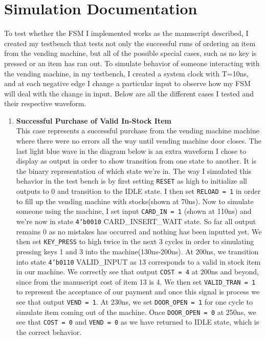 \documentclass{article}
\begin{document}
\section{Simulation Documentation}
To test whether the FSM I implemented works as the manuscript described, I created my testbench that tests not only the successful runs of ordering an item from the vending machine, but all of the possible special cases, such as no key is pressed or an item has ran out. To simulate behavior of someone interacting with the vending machine, in my testbench, I created a system clock with T=10ns, and at each negative edge I change a particular input to observe how my FSM will deal with the change in input. Below are all the different cases I tested and their respective waveform.
\begin{enumerate}
    \item \textbf{Successful Purchase of Valid In-Stock Item} \\
    This case represents a successful purchase from the vending machine machine where there were no errors all the way until vending machine door closes. The last light blue wave in the diagram below is an extra waveform I chose to display as output in order to show transition from one state to another. It is the binary representation of which state we're in. The way I simulated this behavior in the test bench is by first setting \texttt{RESET} as high to initialize all outputs to 0 and transition to the IDLE state. I then set \texttt{RELOAD = 1} in order to fill up the vending machine with stocks(shown at 70ns). Now to simulate someone using the machine, I set input \texttt{CARD\_IN = 1} (shown at 110ns) and we're now in state \texttt{4'b0010} CARD\_INSERT\_WAIT state. So far all output remains 0 as no mistakes has occurred and nothing has been inputted yet. We then set \texttt{KEY\_PRESS} to high twice in the next 3 cycles in order to simulating pressing keys 1 and 3 into the machine(130ns-200ns). At 200ns, we transition into state \texttt{4'b0110} VALID\_INPUT as 13 corresponds to a valid in stock item in our machine. We correctly see that output \texttt{COST = 4} at 200ns and beyond, since from the manuscript cost of item 13 is 4. We then set \texttt{VALID\_TRAN = 1} to represent the acceptance of our payment and once this signal is process we see that output \texttt{VEND = 1}. At 230ns, we set \texttt{DOOR\_OPEN = 1} for one cycle to simulate item coming out of the machine. Once \texttt{DOOR\_OPEN = 0} at 250ns, we see that \texttt{COST = 0} and \texttt{VEND = 0} as we have returned to IDLE state, which is the correct behavior.

\end{enumerate}
\end{document}

